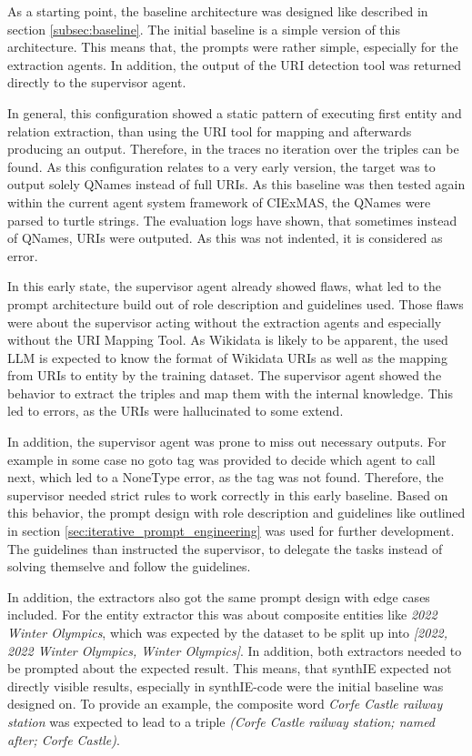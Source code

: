 \documentclass[a4paper,oneside,bibliography=totoc]{scrbook}
\begin{document}
As a starting point, the baseline architecture was designed like described in section \ref{subsec:baseline}. The initial baseline is a simple version of this architecture. This means that, the prompts were rather simple, especially for the extraction agents. In addition, the output of the URI detection tool was returned directly to the supervisor agent.

In general, this configuration showed a static pattern of executing first entity and relation extraction, than using the URI tool for mapping and afterwards producing an output. Therefore, in the traces no iteration over the triples can be found. As this configuration relates to a very early version, the target was to output solely QNames instead of full URIs. As this baseline was then tested again within the current agent system framework of CIExMAS, the QNames were parsed to turtle strings. The evaluation logs have shown, that sometimes instead of QNames, URIs were outputed. As this was not indented, it is considered as error.

In this early state, the supervisor agent already showed flaws, what led to the prompt architecture build out of role description and guidelines used. Those flaws were about the supervisor acting without the extraction agents and especially without the URI Mapping Tool. As Wikidata is likely to be apparent, the used \ac{LLM} is expected to know the format of Wikidata URIs as well as the mapping from URIs to entity by the training dataset. The supervisor agent showed the behavior to extract the triples and map them with the internal knowledge. This led to errors, as the URIs were hallucinated to some extend.

In addition, the supervisor agent was prone to miss out necessary outputs. For example in some case no goto tag was provided to decide which agent to call next, which led to a NoneType error, as the tag was not found. Therefore, the supervisor needed strict rules to work correctly in this early baseline. Based on this behavior, the prompt design with role description and guidelines like outlined in section \ref{sec:iterative_prompt_engineering} was used for further development. The guidelines than instructed the supervisor, to delegate the tasks instead of solving themselve and follow the guidelines.

In addition, the extractors also got the same prompt design with edge cases included. For the entity extractor this was about composite entities like \textit{2022 Winter Olympics}, which was expected by the dataset to be split up into \textit{[2022, 2022 Winter Olympics, Winter Olympics]}. In addition, both extractors needed to be prompted about the expected result. This means, that synthIE expected not directly visible results, especially in synthIE-code were the initial baseline was designed on. To provide an example, the composite word \textit{Corfe Castle railway station} was expected to lead to a triple \textit{(Corfe Castle railway station; named after; Corfe Castle)}.
\end{document}
